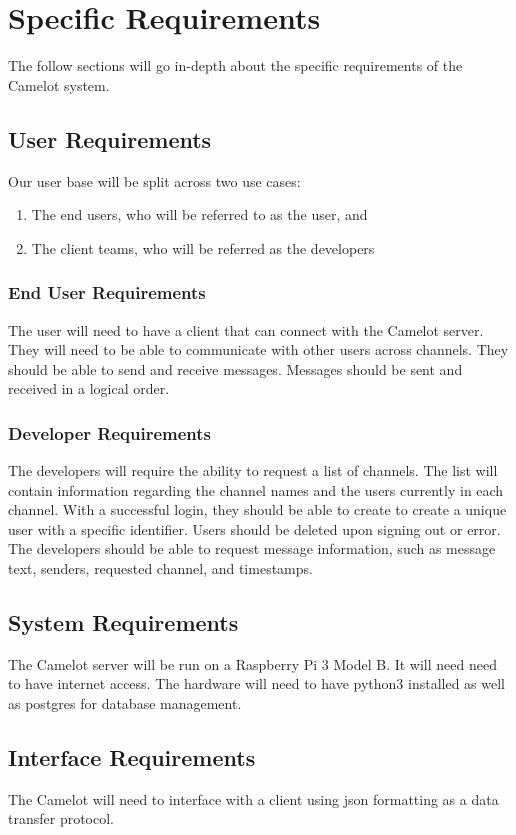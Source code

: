 \chapter{Specific Requirements}\label{specific-requirements}
The follow sections will go in-depth about the specific requirements of the Camelot system.

\section{User Requirements}\label{user-requirements}
Our user base will be split across two use cases:

\begin{enumerate}
    \item The end users, who will be referred to as the user, and
    \item The client teams, who will be referred as the developers
\end{enumerate}

\subsection{End User Requirements}\label{user-requirements-1}
The user will need to have a client that can connect with the Camelot server. They will need to be able to communicate with other users across channels. They should be able to send and receive messages. Messages should be sent and received in a logical order.

\subsection{Developer Requirements}\label{developer-requirements}
The developers will require the ability to request a list of channels. The list will contain information regarding the channel names and the users currently in each channel. With a successful login, they should be able to create to create a unique user with a specific identifier. Users should be deleted upon signing out or error. The developers should be able to request message information, such as message text, senders, requested channel, and timestamps.

\section{System Requirements}\label{system-requirements}
The Camelot server will be run on a Raspberry Pi 3 Model B. It will need need to have internet access. The hardware will need to have \gls{python}3 installed as well as \gls{postgres} for database management.

\section{Interface Requirements}\label{interface-requirements}
The Camelot will need to interface with a client using \gls{json} formatting as a data transfer protocol.
